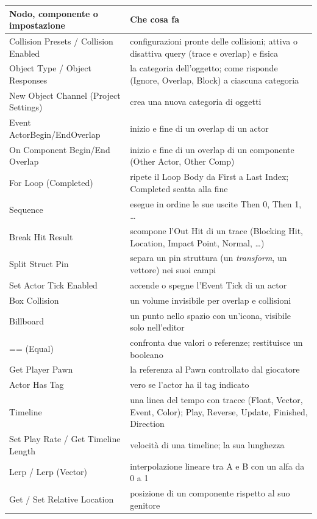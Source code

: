 \begin{table}[htbp]
\centering
\small
\begin{tabular}{@{}p{4.4cm}p{9.6cm}@{}}
\toprule
\textbf{Nodo, componente o impostazione} & \textbf{Che cosa fa} \\
\midrule
Collision Presets / Collision Enabled & configurazioni pronte delle collisioni; attiva o
disattiva query (trace e overlap) e fisica \\
Object Type / Object Responses & la categoria dell'oggetto; come risponde (Ignore,
Overlap, Block) a ciascuna categoria \\
New Object Channel (Project Settings) & crea una nuova categoria di oggetti \\
Event ActorBegin/EndOverlap & inizio e fine di un overlap di un actor \\
On Component Begin/End Overlap & inizio e fine di un overlap di un componente (Other
Actor, Other Comp) \\
For Loop (Completed) & ripete il Loop Body da First a Last Index; Completed scatta alla
fine \\
Sequence & esegue in ordine le sue uscite Then 0, Then 1, \ldots \\
Break Hit Result & scompone l'Out Hit di un trace (Blocking Hit, Location, Impact Point,
Normal, \ldots) \\
Split Struct Pin & separa un pin struttura (un \emph{transform}, un vettore) nei suoi
campi \\
Set Actor Tick Enabled & accende o spegne l'Event Tick di un actor \\
Box Collision & un volume invisibile per overlap e collisioni \\
Billboard & un punto nello spazio con un'icona, visibile solo nell'editor \\
== (Equal) & confronta due valori o referenze; restituisce un booleano \\
Get Player Pawn & la referenza al Pawn controllato dal giocatore \\
Actor Has Tag & vero se l'actor ha il tag indicato \\
Timeline & una linea del tempo con tracce (Float, Vector, Event, Color); Play, Reverse,
Update, Finished, Direction \\
Set Play Rate / Get Timeline Length & velocità di una timeline; la sua lunghezza \\
Lerp / Lerp (Vector) & interpolazione lineare tra A e B con un alfa da 0 a 1 \\
Get / Set Relative Location & posizione di un componente rispetto al suo genitore \\

\end{tabular}
\end{table}
